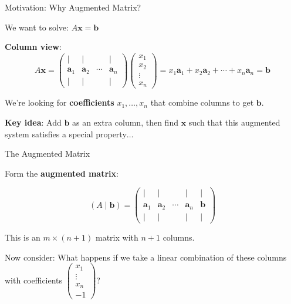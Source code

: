 \documentclass[10pt]{beamer}
\theoremstyle{definition}
\newcommand{\x}[1]{\alert{\textbf{#1}}}
\begin{document}
\begin{frame}{Motivation: Why Augmented Matrix?}

We want to solve: $A\mathbf{x} = \mathbf{b}$

\vspace{1em}

\x{Column view}:
$$A\mathbf{x} = \begin{pmatrix} | & | & & | \\ \mathbf{a}_1 & \mathbf{a}_2 & \cdots & \mathbf{a}_n \\ | & | & & | \end{pmatrix} \begin{pmatrix} x_1 \\ x_2 \\ \vdots \\ x_n \end{pmatrix} = x_1\mathbf{a}_1 + x_2\mathbf{a}_2 + \cdots + x_n\mathbf{a}_n = \mathbf{b}$$

\vspace{0.5em}

We're looking for \x{coefficients} $x_1, \ldots, x_n$ that combine columns to get $\mathbf{b}$.

\vspace{1em}

\x{Key idea}: Add $\mathbf{b}$ as an extra column, then find $\mathbf{x}$ such that this augmented system satisfies a special property$\ldots$

\end{frame}

\begin{frame}{The Augmented Matrix}

Form the \x{augmented matrix}:

$$(A \mid \mathbf{b}) = \begin{pmatrix} | & | & & | & | \\ \mathbf{a}_1 & \mathbf{a}_2 & \cdots & \mathbf{a}_n & \mathbf{b} \\ | & | & & | & | \end{pmatrix}$$

\vspace{1em}

This is an $m \times (n+1)$ matrix with $n+1$ columns.

\vspace{1em}

Now consider: What happens if we take a linear combination of these columns with coefficients $\begin{pmatrix} x_1 \\ \vdots \\ x_n \\ -1 \end{pmatrix}$?

\end{frame}
\end{document}
